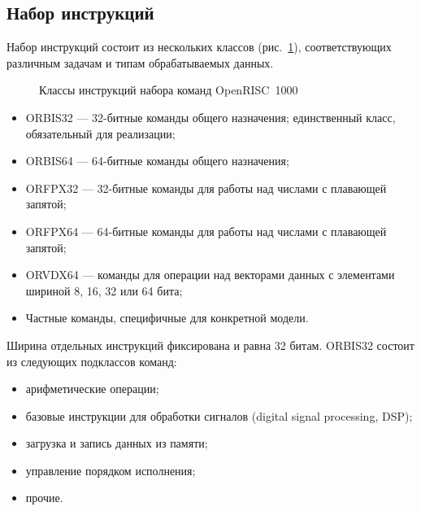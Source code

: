 \subsection{Набор инструкций}

Набор инструкций состоит из нескольких классов (рис.~\ref{fig:or1k-isa}), соответствующих различным задачам и типам обрабатываемых данных.

\begin{figure}[htbp]
\centering
{}
\caption{Классы инструкций набора команд OpenRISC~1000}\label{fig:or1k-isa}
\end{figure}

\begin{itemize}
    \item ORBIS32 --- 32-битные команды общего назначения; единственный класс, обязательный для реализации;
    \item ORBIS64 --- 64-битные команды общего назначения;
    \item ORFPX32 --- 32-битные команды для работы над числами с плавающей запятой;
    \item ORFPX64 --- 64-битные команды для работы над числами с плавающей запятой;
    \item ORVDX64 --- команды для операции над векторами данных с элементами шириной 8, 16, 32 или 64 бита;
    \item Частные команды, специфичные для конкретной модели.
\end{itemize}

Ширина отдельных инструкций фиксирована и равна 32 битам. ORBIS32 состоит из следующих подклассов команд:

\begin{itemize}
    \item арифметические операции;
    \item базовые инструкции для обработки сигналов (\abbr digital signal processing, DSP);
    \item загрузка и запись данных из памяти;
    \item управление порядком исполнения;
    \item прочие.
\end{itemize}

